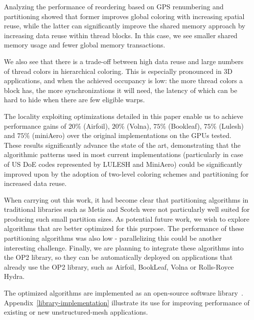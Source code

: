\documentclass[number]{elsarticle}
\begin{document}
Analyzing the performance of reordering based on GPS renumbering and 
partitioning showed that former improves global coloring with increasing 
spatial reuse, while the latter can significantly improve the shared memory 
approach by increasing data reuse within thread blocks. In this case, we 
see smaller shared memory usage and fewer global memory transactions.

We also see that there is a trade-off between high data reuse and large numbers 
of thread colors in hierarchical coloring. This is especially pronounced in 3D 
applications, and when the achieved occupancy is low: the more thread colors a 
block has, the more synchronizations it will need, the latency of which can be 
hard to hide when there are few eligible warps.

The locality exploiting optimizations detailed in this paper enable us to 
achieve performance gains of $20\%$ (Airfoil), $20\%$ (Volna), $75\%$ 
(Bookleaf), $75\%$ (Lulesh) and $75\%$ (miniAero) over the original 
implementations on the GPUs tested. These results significantly advance the 
state of the art, demonstrating that the algorithmic patterns used in most 
current implementations (particularly in case of US DoE codes represented by 
LULESH and MiniAero) could be significantly improved upon by the adoption of 
two-level coloring schemes and partitioning for increased data reuse.

When carrying out this work, it had become clear that partitioning algorithms in
traditional libraries such as Metis and Scotch were not particularly well suited
for producing such small partition sizes. As potential future work, we wish to
explore algorithms that are better optimized for this purpose. The performance
of these partitioning algorithms was also low - parallelizing this could be
another interesting challenge. Finally, we are planning to integrate these
algorithms into the OP2 library, so they can be automatically deployed on
applications that already use the OP2 library, such as Airfoil, BookLeaf, Volna
or Rolls-Royce Hydra.

The optimized algorithms are implemented as an open-source software 
library~\cite{opt-library}. Appendix~\ref{library-implementation} illustrate its 
use for improving performance of existing or new unstructured-mesh applications.


\end{document}
